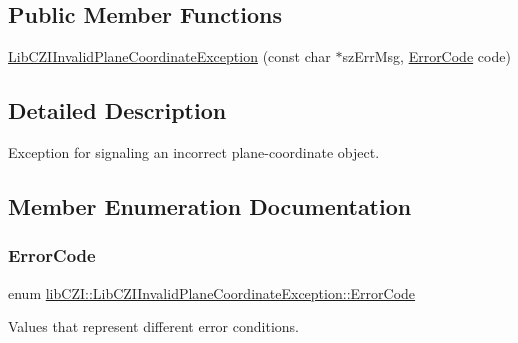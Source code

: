 \subsection*{Public Member Functions}
\begin{DoxyCompactItemize}
\item 
\hyperlink{structlib_c_z_i_1_1_lib_c_z_i_invalid_plane_coordinate_exception_a574543a1bbfb24a9e01f3d3cb4666318}{Lib\+C\+Z\+I\+Invalid\+Plane\+Coordinate\+Exception} (const char $\ast$sz\+Err\+Msg, \hyperlink{structlib_c_z_i_1_1_lib_c_z_i_invalid_plane_coordinate_exception_a2e22a8936930f8e8de4b874764407b60}{Error\+Code} code)
\end{DoxyCompactItemize}


\subsection{Detailed Description}
Exception for signaling an incorrect plane-\/coordinate object. 

\subsection{Member Enumeration Documentation}
\mbox{\label{structlib_c_z_i_1_1_lib_c_z_i_invalid_plane_coordinate_exception_a2e22a8936930f8e8de4b874764407b60}} 
\subsubsection{\texorpdfstring{Error\+Code}{ErrorCode}}
{\footnotesize\ttfamily enum \hyperlink{structlib_c_z_i_1_1_lib_c_z_i_invalid_plane_coordinate_exception_a2e22a8936930f8e8de4b874764407b60}{lib\+C\+Z\+I\+::\+Lib\+C\+Z\+I\+Invalid\+Plane\+Coordinate\+Exception\+::\+Error\+Code}\hspace{0.3cm}{\ttfamily [strong]}}



Values that represent different error conditions. 

